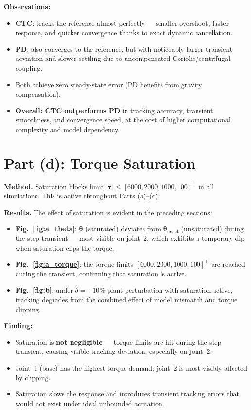 \documentclass[12pt,a4paper]{article}
\begin{document}
\begin{resultbox}
\textbf{Observations:}
\begin{itemize}[nosep]
  \item \textbf{CTC}: tracks the reference almost perfectly --- smaller overshoot, faster response, and quicker convergence thanks to exact dynamic cancellation.
  \item \textbf{PD}: also converges to the reference, but with noticeably larger transient deviation and slower settling due to uncompensated Coriolis/centrifugal coupling.
  \item Both achieve zero steady-state error (PD benefits from gravity compensation).
  \item \textbf{Overall: CTC outperforms PD} in tracking accuracy, transient smoothness, and convergence speed, at the cost of higher computational complexity and model dependency.
\end{itemize}
\end{resultbox}

\section{Part (d): Torque Saturation}
\label{sec:d}

\textbf{Method.} Saturation blocks limit $|\bm{\tau}|\le[6000,2000,1000,100]^\top$ in all simulations. This is active throughout Parts (a)--(c).

\textbf{Results.} The effect of saturation is evident in the preceding sections:
\begin{itemize}[nosep]
  \item \textbf{Fig.~\ref{fig:a_theta}}: $\bm{\theta}$ (saturated) deviates from $\bm{\theta}_{\text{unsat}}$ (unsaturated) during the step transient --- most visible on joint~2, which exhibits a temporary dip when saturation clips the torque.
  \item \textbf{Fig.~\ref{fig:a_torque}}: the torque limits $[6000,2000,1000,100]^\top$ are reached during the transient, confirming that saturation is active.
  \item \textbf{Fig.~\ref{fig:b}}: under $\delta=+10\%$ plant perturbation with saturation active, tracking degrades from the combined effect of model mismatch and torque clipping.
\end{itemize}

\begin{resultbox}
\textbf{Finding:}
\begin{itemize}[nosep]
  \item Saturation is \textbf{not negligible} --- torque limits are hit during the step transient, causing visible tracking deviation, especially on joint~2.
  \item Joint~1 (base) has the highest torque demand; joint~2 is most visibly affected by clipping.
  \item Saturation slows the response and introduces transient tracking errors that would not exist under ideal unbounded actuation.
\end{itemize}
\end{resultbox}
\end{document}
